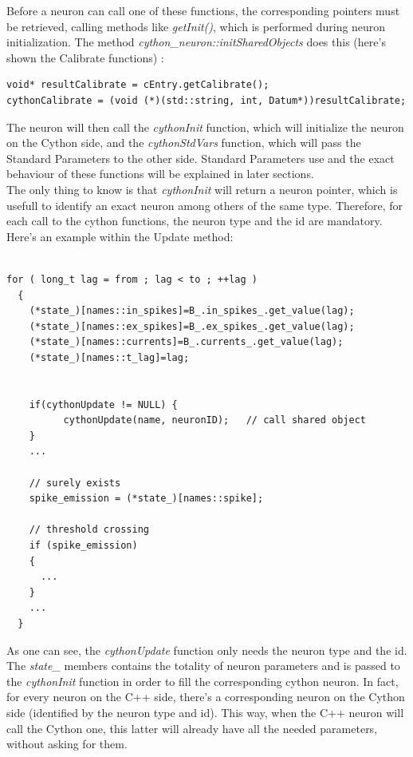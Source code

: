 \documentclass{article}
\begin{document}
Before a neuron can call one of these functions, the corresponding pointers must be retrieved, calling methods like \emph{getInit()}, which is performed during neuron initialization. The method \emph{cython\_neuron::initSharedObjects} does this (here's shown the Calibrate functions) :
\begin{verbatim}
void* resultCalibrate = cEntry.getCalibrate();
cythonCalibrate = (void (*)(std::string, int, Datum*))resultCalibrate;
\end{verbatim}
The neuron will then call the \emph{cythonInit} function, which will initialize the neuron on the Cython side, and the \emph{cythonStdVars} function, which will pass the Standard Parameters to the other side. Standard Parameters use and the exact behaviour of these functions will be explained in later sections. \\
The only thing to know is that \emph{cythonInit} will return a neuron pointer, which is usefull to identify an exact neuron among others of the same type. Therefore, for each call to the cython functions, the neuron type and the id are mandatory. Here's an example within the Update method:\\ \\
\begin{verbatim}
for ( long_t lag = from ; lag < to ; ++lag )
  {
    (*state_)[names::in_spikes]=B_.in_spikes_.get_value(lag);
    (*state_)[names::ex_spikes]=B_.ex_spikes_.get_value(lag);
    (*state_)[names::currents]=B_.currents_.get_value(lag);
    (*state_)[names::t_lag]=lag;


    if(cythonUpdate != NULL) {
    	  cythonUpdate(name, neuronID);   // call shared object
    }
    ...

    // surely exists
    spike_emission = (*state_)[names::spike];

    // threshold crossing
    if (spike_emission)
    {
      ...
    }
    ...
  }
\end{verbatim}
As one can see, the \emph{cythonUpdate} function only needs the neuron type and the id. The \emph{state\_} members contains the totality of neuron parameters and is passed to the \emph{cythonInit} function in order to fill the corresponding cython neuron. In fact, for every neuron on the C++ side, there's a corresponding neuron on the Cython side (identified by the neuron type and id). This way, when the C++ neuron will call the Cython one, this latter will already have all the needed parameters, without asking for them.
\end{document}

